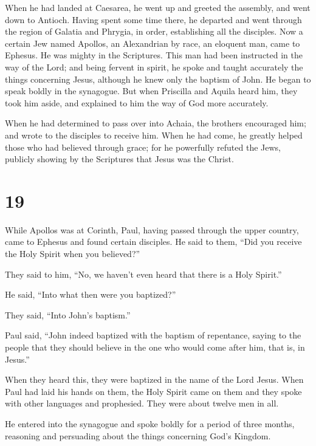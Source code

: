  When he had landed at Caesarea, he went up and greeted the
assembly, and went down to Antioch.  Having spent some time
there, he departed and went through the region of Galatia and Phrygia,
in order, establishing all the disciples.  Now a certain
Jew named Apollos, an Alexandrian by race, an eloquent man, came to
Ephesus. He was mighty in the Scriptures.  This man had
been instructed in the way of the Lord; and being fervent in spirit, he
spoke and taught accurately the things concerning Jesus, although he
knew only the baptism of John.  He began to speak boldly in
the synagogue. But when Priscilla and Aquila heard him, they took him
aside, and explained to him the way of God more accurately.

 When he had determined to pass over into Achaia, the
brothers encouraged him; and wrote to the disciples to receive him. When
he had come, he greatly helped those who had believed through grace;
 for he powerfully refuted the Jews, publicly showing by
the Scriptures that Jesus was the Christ.

\hypertarget{section-18}{%
\section{19}\label{section-18}}

 While Apollos was at Corinth, Paul, having passed through
the upper country, came to Ephesus and found certain disciples.
 He said to them, ``Did you receive the Holy Spirit when you
believed?''

They said to him, ``No, we haven't even heard that there is a Holy
Spirit.''

 He said, ``Into what then were you baptized?''

They said, ``Into John's baptism.''

 Paul said, ``John indeed baptized with the baptism of
repentance, saying to the people that they should believe in the one who
would come after him, that is, in Jesus.''

 When they heard this, they were baptized in the name of the
Lord Jesus.  When Paul had laid his hands on them, the Holy
Spirit came on them and they spoke with other languages and prophesied.
 They were about twelve men in all.

 He entered into the synagogue and spoke boldly for a period
of three months, reasoning and persuading about the things concerning
God's Kingdom.

